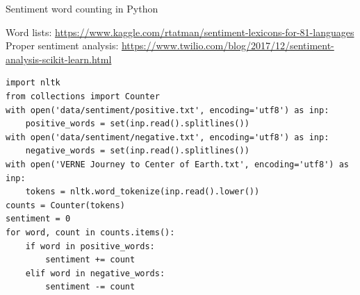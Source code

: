 \documentclass[aspectratio=169,usenames,dvipsnames]{beamer}
\begin{document}
\begin{frame}[fragile]{Sentiment word counting in Python}
    \begin{reference}\scriptsize
        Word lists: \url{https://www.kaggle.com/rtatman/sentiment-lexicons-for-81-languages} \\
        Proper sentiment analysis: \url{https://www.twilio.com/blog/2017/12/sentiment-analysis-scikit-learn.html}
    \end{reference}
\begin{lstlisting}
import nltk
from collections import Counter
with open('data/sentiment/positive.txt', encoding='utf8') as inp:
    positive_words = set(inp.read().splitlines())
with open('data/sentiment/negative.txt', encoding='utf8') as inp:
    negative_words = set(inp.read().splitlines())
with open('VERNE Journey to Center of Earth.txt', encoding='utf8') as inp:
    tokens = nltk.word_tokenize(inp.read().lower())
counts = Counter(tokens)
sentiment = 0
for word, count in counts.items():
    if word in positive_words:
        sentiment += count
    elif word in negative_words:
        sentiment -= count
\end{lstlisting}
\end{frame}
\end{document}
